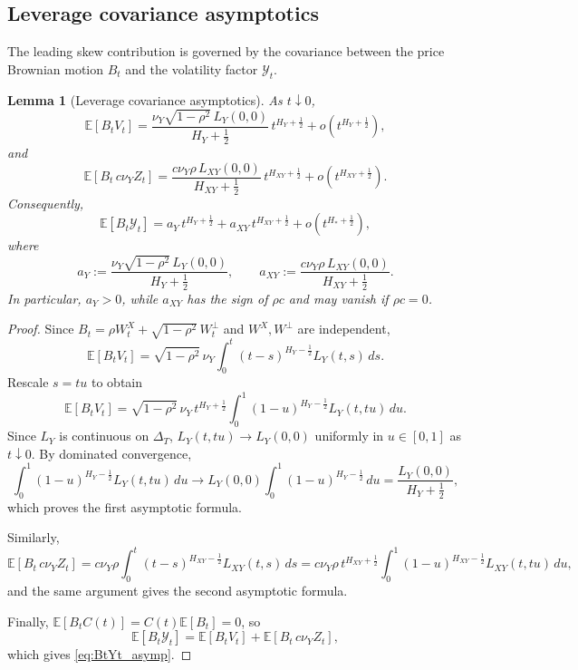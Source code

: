 \documentclass[11pt,a4paper]{amsart}
\theoremstyle{plain}
\newtheorem{lemma}[theorem]{Lemma}
\theoremstyle{definition}
\theoremstyle{remark}
\newcommand{\EE}{\mathbb{E}}
\begin{document}
\subsection{Leverage covariance asymptotics}\label{subsec:leverage_asymp}

The leading skew contribution is governed by the covariance between the price Brownian motion $B_t$ and the volatility factor $\mathcal Y_t$.

\begin{lemma}[Leverage covariance asymptotics]\label{lem:leverage_cov_asymp}
As $t\downarrow 0$,
\[
\EE[B_t V_t]
=
\frac{\nu_Y\sqrt{1-\rho^2}\,L_Y(0,0)}{H_Y+\frac12}\,
t^{H_Y+\frac12}
+
o\!\left(t^{H_Y+\frac12}\right),
\]
and
\[
\EE[B_t \, c\nu_Y Z_t]
=
\frac{c\nu_Y\rho\,L_{XY}(0,0)}{H_{XY}+\frac12}\,
t^{H_{XY}+\frac12}
+
o\!\left(t^{H_{XY}+\frac12}\right).
\]
Consequently,
\begin{equation}\label{eq:BtYt_asymp}
\EE[B_t\mathcal Y_t]
=
a_Y\,t^{H_Y+\frac12}
+
a_{XY}\,t^{H_{XY}+\frac12}
+
o\!\left(t^{H_*+\frac12}\right),
\end{equation}
where
\[
a_Y:=\frac{\nu_Y\sqrt{1-\rho^2}\,L_Y(0,0)}{H_Y+\frac12},
\qquad
a_{XY}:=\frac{c\nu_Y\rho\,L_{XY}(0,0)}{H_{XY}+\frac12}.
\]
In particular, $a_Y>0$, while $a_{XY}$ has the sign of $\rho c$ and may vanish if $\rho c=0$.
\end{lemma}

\begin{proof}
Since $B_t=\rho W_t^X+\sqrt{1-\rho^2}\,W_t^\perp$ and $W^X,W^\perp$ are independent,
\[
\EE[B_tV_t]
=
\sqrt{1-\rho^2}\,\nu_Y
\int_0^t (t-s)^{H_Y-\frac12}L_Y(t,s)\,ds.
\]
Rescale $s=tu$ to obtain
\[
\EE[B_tV_t]
=
\sqrt{1-\rho^2}\,\nu_Y\,t^{H_Y+\frac12}
\int_0^1 (1-u)^{H_Y-\frac12}L_Y(t,tu)\,du.
\]
Since $L_Y$ is continuous on $\Delta_T$, $L_Y(t,tu)\to L_Y(0,0)$ uniformly in $u\in[0,1]$ as $t\downarrow0$. By dominated convergence,
\[
\int_0^1 (1-u)^{H_Y-\frac12}L_Y(t,tu)\,du
\to
L_Y(0,0)\int_0^1 (1-u)^{H_Y-\frac12}\,du
=
\frac{L_Y(0,0)}{H_Y+\frac12},
\]
which proves the first asymptotic formula.

Similarly,
\[
\EE[B_t\,c\nu_Y Z_t]
=
c\nu_Y\rho
\int_0^t (t-s)^{H_{XY}-\frac12}L_{XY}(t,s)\,ds
=
c\nu_Y\rho\,t^{H_{XY}+\frac12}
\int_0^1 (1-u)^{H_{XY}-\frac12}L_{XY}(t,tu)\,du,
\]
and the same argument gives the second asymptotic formula.

Finally, $\EE[B_tC(t)]=C(t)\EE[B_t]=0$, so
\[
\EE[B_t\mathcal Y_t]
=
\EE[B_tV_t]+\EE[B_t\,c\nu_Y Z_t],
\]
which gives \eqref{eq:BtYt_asymp}.
\end{proof}
\end{document}
